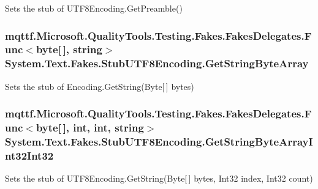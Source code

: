 Sets the stub of U\-T\-F8\-Encoding.\-Get\-Preamble()

\hypertarget{class_system_1_1_text_1_1_fakes_1_1_stub_u_t_f8_encoding_a1f207559b89b8de22c96049099a57b8e}{
\subsubsection[{Get\-String\-Byte\-Array}]{\setlength{\rightskip}{0pt plus 5cm}mqttf.\-Microsoft.\-Quality\-Tools.\-Testing.\-Fakes.\-Fakes\-Delegates.\-Func$<$byte\mbox{[}$\,$\mbox{]}, string$>$ System.\-Text.\-Fakes.\-Stub\-U\-T\-F8\-Encoding.\-Get\-String\-Byte\-Array}}\label{class_system_1_1_text_1_1_fakes_1_1_stub_u_t_f8_encoding_a1f207559b89b8de22c96049099a57b8e}


Sets the stub of Encoding.\-Get\-String(\-Byte\mbox{[}$\,$\mbox{]} bytes)

\hypertarget{class_system_1_1_text_1_1_fakes_1_1_stub_u_t_f8_encoding_ae205b3b1f1ec0d76a77e174c78ba8039}{
\subsubsection[{Get\-String\-Byte\-Array\-Int32\-Int32}]{\setlength{\rightskip}{0pt plus 5cm}mqttf.\-Microsoft.\-Quality\-Tools.\-Testing.\-Fakes.\-Fakes\-Delegates.\-Func$<$byte\mbox{[}$\,$\mbox{]}, int, int, string$>$ System.\-Text.\-Fakes.\-Stub\-U\-T\-F8\-Encoding.\-Get\-String\-Byte\-Array\-Int32\-Int32}}\label{class_system_1_1_text_1_1_fakes_1_1_stub_u_t_f8_encoding_ae205b3b1f1ec0d76a77e174c78ba8039}


Sets the stub of U\-T\-F8\-Encoding.\-Get\-String(\-Byte\mbox{[}$\,$\mbox{]} bytes, Int32 index, Int32 count)

